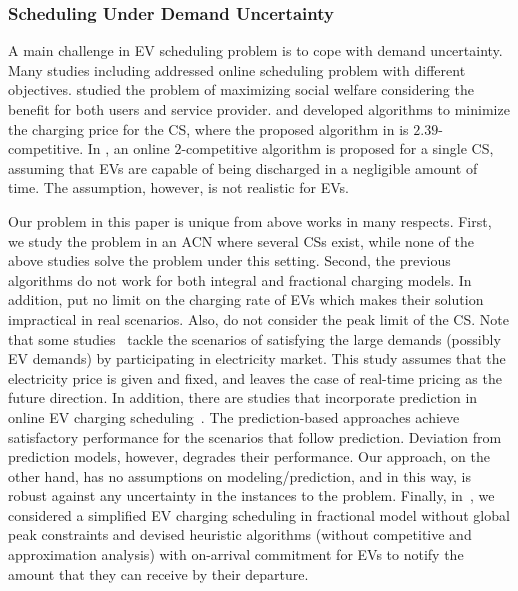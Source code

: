 \documentclass[journal]{IEEEtran}
\newcommand{\revv}[1]{{\color{black}#1}}%
\begin{document}
\subsubsection{Scheduling Under Demand Uncertainty}
A main challenge in EV scheduling problem is to cope with demand uncertainty. Many studies including \cite{Shroff2014,Tang,WTang,Chen,Xiang,Zhao,Robu} addressed online scheduling problem with different objectives. \cite{Shroff2014,Xiang} studied the problem of maximizing social welfare considering the benefit for both users and service provider. \cite{Tang} and \cite{WTang} developed algorithms to minimize the charging price for the CS, where the proposed algorithm in \cite{Tang} is $2.39$-competitive. 
In \cite{Robu}, an online $2$-competitive algorithm is proposed for a single CS, assuming that EVs are capable of being discharged in a negligible amount of time. The assumption, however, is not realistic for EVs.

Our problem in this paper is unique from above works in many respects. First, we study the problem in an ACN where several CSs exist, while none of the above studies solve the problem under this setting. Second, the previous algorithms do not work for both integral and fractional charging models. In addition, \cite{WTang,Chen} put no limit on the charging rate of EVs which makes their solution impractical in real scenarios. Also, \cite{WTang,Tang, Shroff2014,Chen,Zhao} do not consider the peak limit of the CS. 
\revv{Note that some studies~\cite{jin2017optimal} tackle the scenarios of satisfying the large demands (possibly EV demands) by participating in electricity market. This study assumes that the electricity price is given and fixed, and leaves the case of real-time pricing as the future direction. In addition, there are studies that incorporate prediction in online EV charging scheduling~\cite{wang2017predictive,chen2014distributional}. The prediction-based approaches achieve satisfactory performance for the scenarios that follow prediction. Deviation from prediction models, however, degrades their performance. Our approach, on the other hand, has no assumptions on modeling/prediction, and in this way, is robust against any uncertainty in the instances to the problem.} 
\revv{Finally, in~\cite{Alinia2018ITS}, we considered a simplified EV charging scheduling in fractional model without global peak constraints and devised heuristic algorithms (without competitive and approximation analysis) with on-arrival commitment for EVs to notify the amount that they can receive by their departure. }
\end{document}
